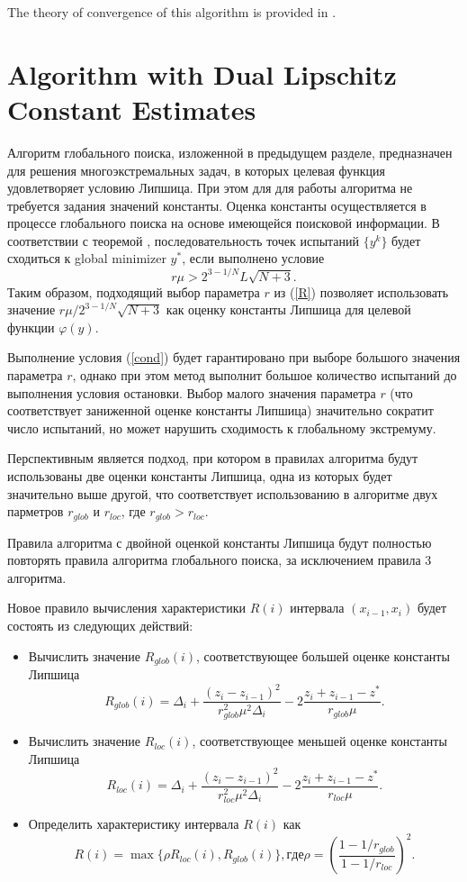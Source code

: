 \documentclass[runningheads]{llncs}
\begin{document}
The theory of convergence of this algorithm is provided in \cite{Strongin2000}.

\section{Algorithm with Dual Lipschitz Constant Estimates}

Алгоритм глобального поиска, изложенной в предыдущем разделе, предназначен для решения многоэкстремальных задач, в которых целевая функция удовлетворяет условию Липшица. При этом для для работы алгоритма не требуется задания  значений константы. Оценка константы осуществляется в процессе глобального поиска на основе имеющейся поисковой информации. 
В соответствии с теоремой \cite{Strongin2000}, последовательность точек испытаний $\{y^k\}$ будет сходиться к global minimizer $y^*$, если выполнено условие  
\begin{equation}\label{cond}
r\mu > 2^{3-1/N}L\sqrt{N+3}.
\end{equation}
Таким образом, подходящий выбор параметра $r$ из (\ref{R}) позволяет использовать значение $r\mu / 2^{3-1/N}\sqrt{N+3}$ как оценку константы Липшица для целевой функции $\varphi(y)$.

Выполнение условия (\ref{cond}) будет гарантировано при выборе большого значения параметра $r$, однако при этом метод выполнит большое количество испытаний до выполнения условия остановки.
Выбор малого значения параметра $r$ (что соответствует заниженной оценке константы Липшица) значительно сократит число испытаний, но может нарушить сходимость к глобальному экстремуму.

Перспективным является подход, при котором в правилах алгоритма будут использованы две оценки константы Липшица, одна из которых будет значительно выше другой, что соответствует использованию в алгоритме двух парметров $r_{glob}$ и $r_{loc}$, где $r_{glob} > r_{loc}$.

Правила алгоритма с двойной оценкой константы Липшица будут полностью повторять правила алгоритма глобального поиска, за исключением правила 3 алгоритма.

Новое правило вычисления характеристики $R(i)$ интервала $(x_{i-1}, x_i)$ будет состоять из следующих действий:
\begin{itemize}
\item
Вычислить значение $R_{glob}(i)$, соответствующее большей оценке константы Липшица
\[
R_{glob}(i)=\Delta_i+\frac{(z_i-z_{i-1})^2}{r_{glob}^2\mu^2\Delta_i}-2\frac{z_i+z_{i-1}-z^*}{r_{glob}\mu}.
\]
\item
Вычислить значение $R_{loc}(i)$, соответствующее меньшей оценке константы Липшица
\[
R_{loc}(i)=\Delta_i+\frac{(z_i-z_{i-1})^2}{r_{loc}^2\mu^2\Delta_i}-2\frac{z_i+z_{i-1}-z^*}{r_{loc}\mu}.
\]
\item
Определить характеристику интервала $R(i)$ как
\begin{equation}\label{pho}
R(i) = \max\{\rho R_{loc}(i),R_{glob}(i)\}, где \rho = \left(\frac{1-1/r_{glob}}{1-1/r_{loc}}\right)^2.
\end{equation}
\end{itemize}
\end{document}
